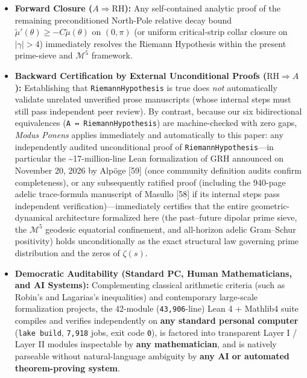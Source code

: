 \documentclass[
  11pt,
]{article}
\providecommand{\tightlist}{%
  \setlength{\itemsep}{0pt}\setlength{\parskip}{0pt}}
\begin{document}
\begin{itemize}
\tightlist
\item
  \textbf{Forward Closure (\(A \Rightarrow \mathrm{RH}\)):} Any
  self-contained analytic proof of the remaining preconditioned
  North-Pole relative decay bound
  \(\tilde{\mu}'(\theta) \ge -C\tilde{\mu}(\theta)\) on \((0, \pi)\) (or
  uniform critical-strip collar closure on \(|\gamma| > 4\)) immediately
  resolves the Riemann Hypothesis within the present prime-sieve and
  \(\mathcal{M}^5\) framework.
\item
  \textbf{Backward Certification by External Unconditional Proofs
  (\(\mathrm{RH} \Rightarrow A\)):} Establishing that
  \texttt{RiemannHypothesis} is true does \emph{not} automatically
  validate unrelated unverified prose manuscripts (whose internal steps
  must still pass independent peer review). By contrast, because our six
  bidirectional equivalences (\texttt{A\ ↔\ RiemannHypothesis}) are
  machine-checked with zero gaps, \emph{Modus Ponens} applies
  immediately and automatically to this paper: any independently audited
  unconditional proof of \texttt{RiemannHypothesis}---in particular the
  \textasciitilde17-million-line Lean formalization of GRH announced on
  November 20, 2026 by Alpöge {[}59{]} (once community definition audits
  confirm completeness), or any subsequently ratified proof (including
  the 940-page adelic trace-formula manuscript of Masullo {[}58{]} if
  its internal steps pass independent verification)---immediately
  certifies that the entire geometric-dynamical architecture formalized
  here (the past--future dipolar prime sieve, the \(\mathcal{M}^5\)
  geodesic equatorial confinement, and all-horizon adelic Gram--Schur
  positivity) holds unconditionally as the exact structural law
  governing prime distribution and the zeros of \(\zeta(s)\).
\item
  \textbf{Democratic Auditability (Standard PC, Human Mathematicians,
  and AI Systems):} Complementing classical arithmetic criteria (such as
  Robin's and Lagarias's inequalities) and contemporary large-scale
  formalization projects, the 42-module (\texttt{43,906}-line) Lean 4 +
  Mathlib4 suite compiles and verifies independently on \textbf{any
  standard personal computer} (\texttt{lake\ build}, \texttt{7,918}
  jobs, exit code \texttt{0}), is factored into transparent Layer I /
  Layer II modules inspectable by \textbf{any mathematician}, and is
  natively parseable without natural-language ambiguity by \textbf{any
  AI or automated theorem-proving system}.
\end{itemize}
\end{document}
